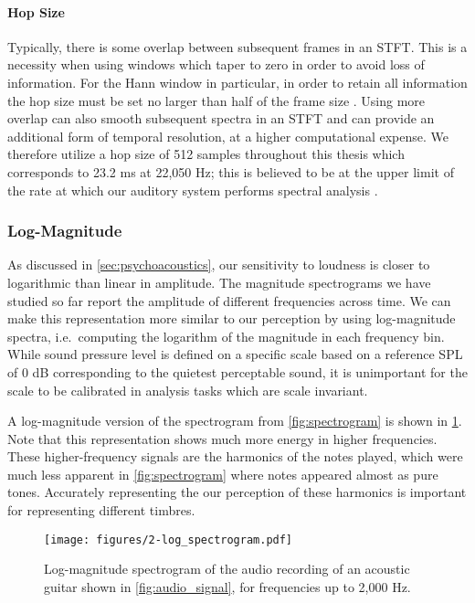 \paragraph{Hop Size}

Typically, there is some overlap between subsequent frames in an STFT.
This is a necessity when using windows which taper to zero in order to avoid loss of information.
For the Hann window in particular, in order to retain all information the hop size must be set no larger than half of the frame size \cite{}.
Using more overlap can also smooth subsequent spectra in an STFT and can provide an additional form of temporal resolution, at a higher computational expense.
We therefore utilize a hop size of 512 samples throughout this thesis which corresponds to 23.2 ms at 22,050 Hz; this is believed to be at the upper limit of the rate at which our auditory system performs spectral analysis \cite{}.

\subsubsection{Log-Magnitude}

As discussed in \cref{sec:psychoacoustics}, our sensitivity to loudness is closer to logarithmic than linear in amplitude.
The magnitude spectrograms we have studied so far report the amplitude of different frequencies across time.
We can make this representation more similar to our perception by using log-magnitude spectra, i.e.\ computing the logarithm of the magnitude in each frequency bin.
While sound pressure level is defined on a specific scale based on a reference SPL of 0 dB corresponding to the quietest perceptable sound, it is unimportant for the scale to be calibrated in analysis tasks which are scale invariant.

A log-magnitude version of the spectrogram from \cref{fig:spectrogram} is shown in \cref{fig:log_spectrogram}.
Note that this representation shows much more energy in higher frequencies.
These higher-frequency signals are the harmonics of the notes played, which were much less apparent in \cref{fig:spectrogram} where notes appeared almost as pure tones.
Accurately representing the our perception of these harmonics is important for representing different timbres.

\begin{figure}
  \centering
  \texttt{[image: figures/2-log\_spectrogram.pdf]}
  \caption[Log-magnitude spectrogram of the acoustic guitar recording]{Log-magnitude spectrogram of the audio recording of an acoustic guitar shown in \cref{fig:audio_signal}, for frequencies up to 2,000 Hz.}
  \label{fig:log_spectrogram}
\end{figure}

